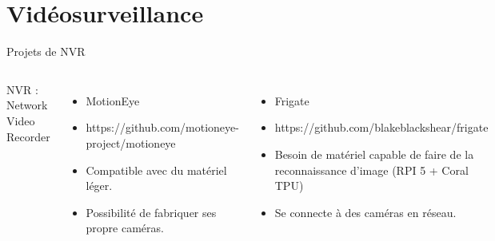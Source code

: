 \documentclass[aspectratio=169,xcolor=dvipsnames]{beamer}
\begin{document}
\section{Vidéosurveillance}
\begin{frame}{Projets de NVR}
    \begin{columns}[c] %

        NVR : Network Video Recorder

        \begin{itemize}
            \item MotionEye
            \item https://github.com/motioneye-project/motioneye
            \item Compatible avec du matériel léger.
            \item Possibilité de fabriquer ses propre caméras.
        \end{itemize}
        \vspace{10pt}
        \begin{itemize}
            \item Frigate
            \item https://github.com/blakeblackshear/frigate
            \item Besoin de matériel capable de faire de la reconnaissance d'image (RPI 5 + Coral TPU)
            \item Se connecte à des caméras en réseau.
        \end{itemize}

    \end{columns}
\end{frame}
\end{document}
